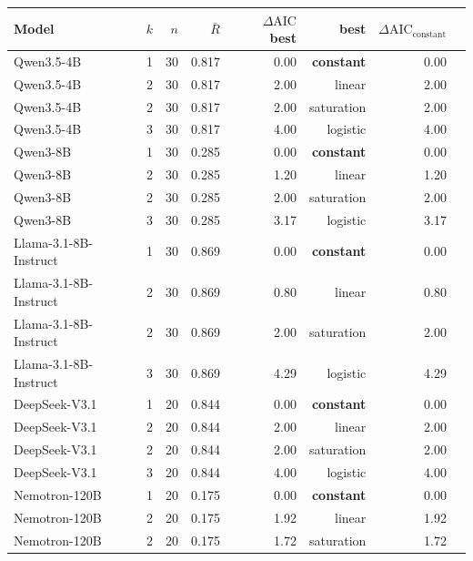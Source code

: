 \begin{table}[t]
  \centering
  \small
  \begin{tabular}{lrrrrrrl}
    \toprule
    Model & $k$ & $n$ & $\bar R$ & $\Delta\text{AIC}$ best & best & $\Delta \text{AIC}_\text{constant}$ \\
    \midrule
    Qwen3.5-4B            & 1 & 30 & 0.817 & 0.00 & \textbf{constant}    & 0.00 \\
    Qwen3.5-4B            & 2 & 30 & 0.817 & 2.00 & linear              & 2.00 \\
    Qwen3.5-4B            & 2 & 30 & 0.817 & 2.00 & saturation          & 2.00 \\
    Qwen3.5-4B            & 3 & 30 & 0.817 & 4.00 & logistic            & 4.00 \\
    Qwen3-8B              & 1 & 30 & 0.285 & 0.00 & \textbf{constant}    & 0.00 \\
    Qwen3-8B              & 2 & 30 & 0.285 & 1.20 & linear              & 1.20 \\
    Qwen3-8B              & 2 & 30 & 0.285 & 2.00 & saturation          & 2.00 \\
    Qwen3-8B              & 3 & 30 & 0.285 & 3.17 & logistic            & 3.17 \\
    Llama-3.1-8B-Instruct & 1 & 30 & 0.869 & 0.00 & \textbf{constant}    & 0.00 \\
    Llama-3.1-8B-Instruct & 2 & 30 & 0.869 & 0.80 & linear              & 0.80 \\
    Llama-3.1-8B-Instruct & 2 & 30 & 0.869 & 2.00 & saturation          & 2.00 \\
    Llama-3.1-8B-Instruct & 3 & 30 & 0.869 & 4.29 & logistic            & 4.29 \\
    DeepSeek-V3.1         & 1 & 20 & 0.844 & 0.00 & \textbf{constant}    & 0.00 \\
    DeepSeek-V3.1         & 2 & 20 & 0.844 & 2.00 & linear              & 2.00 \\
    DeepSeek-V3.1         & 2 & 20 & 0.844 & 2.00 & saturation          & 2.00 \\
    DeepSeek-V3.1         & 3 & 20 & 0.844 & 4.00 & logistic            & 4.00 \\
    Nemotron-120B         & 1 & 20 & 0.175 & 0.00 & \textbf{constant}    & 0.00 \\
    Nemotron-120B         & 2 & 20 & 0.175 & 1.92 & linear              & 1.92 \\
    Nemotron-120B         & 2 & 20 & 0.175 & 1.72 & saturation          & 1.72 \\

\end{tabular}
\end{table}
